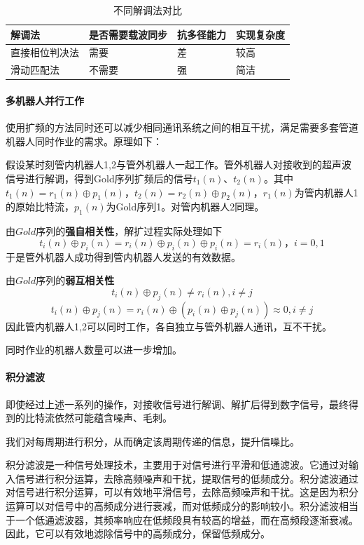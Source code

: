 \documentclass[12pt, a4paper]{article}
\begin{document}
\begin{table}[htbp]
\centering
\caption{不同解调法对比}
\begin{tabular}{p{}p{}p{}p{}}
\toprule
\textbf{解调法} & \textbf{是否需要载波同步} & \textbf{抗多径能力} & \textbf{实现复杂度} \\
\midrule
直接相位判决法 & 需要 & 差 & 较高 \\
滑动匹配法 & 不需要 & 强 & 简洁 \\
\bottomrule
\end{tabular}
\end{table}

\paragraph{多机器人并行工作}

使用扩频的方法同时还可以减少相同通讯系统之间的相互干扰，满足需要多套管道机器人同时作业的需求。原理如下：

假设某时刻管内机器人1,2与管外机器人一起工作。管外机器人对接收到的超声波信号进行解调，得到Gold序列扩频后的信号$t_1(n)、t_2(n)$。其中$t_1(n)=r_1(n)\oplus p_1(n)$，$t_2(n)=r_2(n)\oplus p_2(n)$，$r_1(n)$为管内机器人1的原始比特流，$p_1(n)$为Gold序列1。对管内机器人2同理。

由$Gold$序列的\textbf{强自相关性}，解扩过程实际处理如下
$$t_i(n)\oplus p_i(n)=r_i(n)\oplus p_i(n)\oplus p_i(n)=r_i(n)，i=0,1$$
于是管外机器人成功得到管内机器人发送的有效数据。

由$Gold$序列的\textbf{弱互相关性}
$$ t_i(n)\oplus p_j(n)\neq r_i(n),i\neq j $$$$ t_i(n)\oplus p_j(n)=r_i(n)\oplus (p_i(n)\oplus p_j(n))\approx 0,i\neq j$$
因此管内机器人1,2可以同时工作，各自独立与管外机器人通讯，互不干扰。

同时作业的机器人数量可以进一步增加。

\paragraph{积分滤波}

即使经过上述一系列的操作，对接收信号进行解调、解扩后得到数字信号，最终得到的比特流依然可能蕴含噪声、毛刺。

我们对每周期进行积分，从而确定该周期传递的信息，提升信噪比。

积分滤波是一种信号处理技术，主要用于对信号进行平滑和低通滤波。它通过对输入信号进行积分运算，去除高频噪声和干扰，提取信号的低频成分。积分滤波通过对信号进行积分运算，可以有效地平滑信号，去除高频噪声和干扰。这是因为积分运算可以对信号中的高频成分进行衰减，而对低频成分的影响较小。积分滤波相当于一个低通滤波器，其频率响应在低频段具有较高的增益，而在高频段逐渐衰减。因此，它可以有效地滤除信号中的高频成分，保留低频成分。
\end{document}
